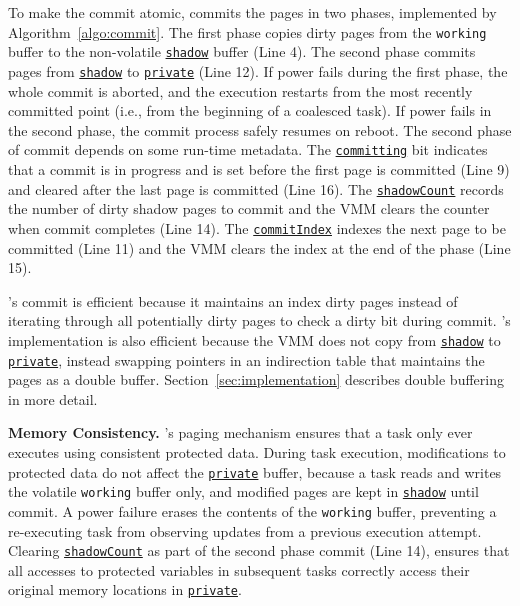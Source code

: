 To make the commit atomic, \sys commits the pages in two phases, implemented by Algorithm~\ref{algo:commit}. The first phase copies dirty pages from the \texttt{working} buffer to the non-volatile \texttt{\underline{shadow}} buffer (Line 4). The second phase commits pages from \texttt{\underline{shadow}} to \texttt{\underline{private}} (Line 12).  If power fails during the first phase, the whole commit is aborted, and the execution restarts from the most recently committed point (i.e., from the beginning of a coalesced task). If power fails in the second
phase, the commit process safely resumes on reboot.  The second phase of commit depends on some run-time metadata. The \texttt{\underline{committing}} bit indicates that a commit is in progress and is set before the first page is committed (Line 9) and cleared after the last page is committed (Line 16).  The \texttt{\underline{shadowCount}} records the number of dirty shadow pages to commit and the VMM clears the counter when commit completes (Line 14). The \texttt{\underline{commitIndex}} indexes the next page to be committed (Line 11) and the VMM clears the index at the end of the phase (Line 15).

\sys's commit is efficient because it maintains an index dirty pages instead of iterating through all potentially dirty pages to check a dirty bit during commit. \sys's implementation is also efficient because the VMM does not copy from \texttt{\underline{shadow}} to \texttt{\underline{private}}, instead swapping pointers in an indirection table that maintains the pages as a double buffer.  Section~\ref{sec:implementation} describes double buffering in more detail. 

\textbf{Memory Consistency.} \sys's paging mechanism ensures that a task only ever executes using consistent protected data. During task execution, modifications to protected data do not affect the \texttt{\underline{private}} buffer, because a task reads and writes the volatile \texttt{working} buffer only, and modified pages are kept in \texttt{\underline{shadow}} until commit. A power failure erases the contents of the \texttt{working} buffer, preventing a re-executing task from observing updates from a previous execution attempt. Clearing \texttt{\underline{shadowCount}} as part of the second phase commit (Line 14), ensures that all accesses to protected variables in subsequent tasks correctly access their original memory locations in \texttt{\underline{private}}.

